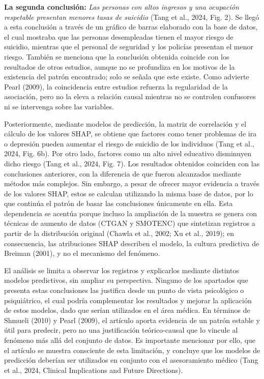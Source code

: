 \documentclass[11pt]{article}
\begin{document}
\textbf{La segunda conclusi\'on:} \emph{Las personas con altos ingresos y una
ocupaci\'on respetable presentan menores tasas de suicidio} (Tang et al., 2024, Fig. 2).
Se lleg\'o a esta conclusi\'on a trav\'es de un gr\'afico de barras elaborado con
la base de datos, el cual mostraba que las personas desempleadas tienen el mayor
riesgo de suicidio, mientras que el personal de seguridad y los polic\'ias presentan
el menor riesgo. Tambi\'en se menciona que la conclusi\'on obtenida coincide con los
resultados de otros estudios, aunque no se profundiza en los motivos de la existencia
del patr\'on encontrado; solo se se\~nala que este existe. Como advierte Pearl (2009),
la coincidencia entre estudios refuerza la regularidad de la asociaci\'on, pero no la
eleva a relaci\'on causal mientras no se controlen confusores ni se intervenga sobre
las variables.

Posteriormente, mediante modelos de predicci\'on, la matriz de correlaci\'on y el
c\'alculo de los valores SHAP, se obtiene que factores como tener problemas de ira o
depresi\'on pueden aumentar el riesgo de suicidio de los individuos (Tang et al., 2024,
Fig. 6b). Por otro lado, factores como un alto nivel educativo disminuyen dicho riesgo
(Tang et al., 2024, Fig. 7). Los resultados obtenidos coinciden con las conclusiones
anteriores, con la diferencia de que fueron alcanzados mediante m\'etodos m\'as complejos.
Sin embargo, a pesar de ofrecer mayor evidencia a trav\'es de los valores SHAP, estos se
calculan utilizando la misma base de datos, por lo que contin\'ua el patr\'on de basar las
conclusiones \'unicamente en ella. Esta dependencia se acent\'ua porque incluso la
ampliaci\'on de la muestra se genera con t\'ecnicas de aumento de datos (CTGAN y SMOTENC)
que sintetizan registros a partir de la distribuci\'on original (Chawla et al., 2002;
Xu et al., 2019); en consecuencia, las atribuciones SHAP describen el modelo, la cultura
predictiva de Breiman (2001), y no el mecanismo del fen\'omeno.

El an\'alisis se limita a observar los registros y explicarlos mediante distintos modelos
predictivos, sin ampliar su perspectiva. Ninguno de los apartados que presenta estas
conclusiones las justifica desde un punto de vista psicol\'ogico o psiqui\'atrico, el cual
podr\'ia complementar los resultados y mejorar la aplicaci\'on de estos modelos, dado que
ser\'ian utilizados en el \'area m\'edica. En t\'erminos de Shmueli (2010) y Pearl (2009),
el art\'iculo aporta evidencia de un patr\'on estable y \'util para predecir, pero no una
justificaci\'on te\'orico-causal que lo vincule al fen\'omeno m\'as all\'a del conjunto de
datos. Es importante mencionar por ello, que el art\'iculo se muestra consciente de esta
limitaci\'on, y concluye que los modelos de predicci\'on deber\'ian ser utilizados en
conjunto con el asesoramiento m\'edico (Tang et al., 2024, Clinical Implications and
Future Directions).
\end{document}
